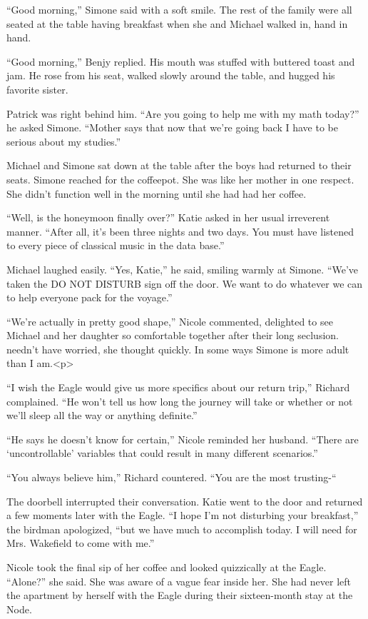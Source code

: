 \documentclass[]{article}
\begin{document}
{“Good morning,” Simone said with a soft smile. The rest of the family were all seated at the table having breakfast when she and Michael walked in, hand in hand.

“Good morning,” Benjy replied. His mouth was stuffed with buttered toast and jam. He rose from his seat, walked slowly around the table, and hugged his favorite sister.

Patrick was right behind him. “Are you going to help me with my math today?” he asked Simone. “Mother says that now that we’re going back I have to be serious about my studies.”

Michael and Simone sat down at the table after the boys had returned to their seats. Simone reached for the coffeepot. She was like her mother in one respect. She didn’t function well in the morning until she had had her coffee.

“Well, is the honeymoon finally over?” Katie asked in her usual irreverent manner. “After all, it’s been three nights and two days. You must have listened to every piece of classical music in the data base.”

Michael laughed easily. “Yes, Katie,” he said, smiling warmly at Simone. “We’ve taken the DO NOT DISTURB sign off the door. We want to do whatever we can to help everyone pack for the voyage.”

“We’re actually in pretty good shape,” Nicole commented, delighted to see Michael and her daughter so comfortable together after their long seclusion. needn’t have worried, she thought quickly. In some ways Simone is more adult than I am.<p>

“I wish the Eagle would give us more specifics about our return trip,” Richard complained. “He won’t tell us how long the journey will take or whether or not we’ll sleep all the way or anything definite.”

“He says he doesn’t know for certain,” Nicole reminded her husband. “There are ‘uncontrollable’ variables that could result in many different scenarios.”

“You always believe him,” Richard countered. “You are the most trusting-“

The doorbell interrupted their conversation. Katie went to the door and returned a few moments later with the Eagle. “I hope I’m not disturbing your breakfast,” the birdman apologized, “but we have much to accomplish today. I will need for Mrs. Wakefield to come with me.”

Nicole took the final sip of her coffee and looked quizzically at the Eagle. “Alone?” she said. She was aware of a vague fear inside her. She had never left the apartment by herself with the Eagle during their sixteen-month stay at the Node.

}
\end{document}
